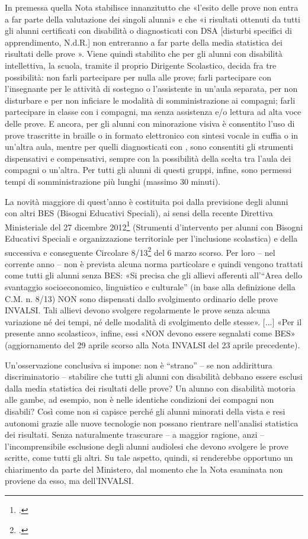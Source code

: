 In premessa quella Nota stabilisce innanzitutto che «l'esito delle prove non entra a far parte della valutazione dei singoli alunni» e che «i risultati ottenuti da tutti gli alunni certificati con disabilità o diagnosticati con DSA [disturbi specifici di apprendimento, N.d.R.] non entreranno a far parte della media statistica dei risultati delle prove ».
Viene quindi stabilito che per gli alunni con disabilità intellettiva, la scuola, tramite il proprio Dirigente Scolastico, decida fra tre possibilità: non farli partecipare per nulla alle prove; farli partecipare con l'insegnante per le attività di sostegno o l'assistente in un'aula separata, per non disturbare e per non inficiare le modalità di somministrazione ai compagni; farli partecipare in classe con i compagni, ma senza assistenza e/o lettura ad alta voce delle prove.
E ancora, per gli alunni con minorazione visiva è consentito l'uso di prove trascritte in braille o in formato elettronico con sintesi vocale in cuffia o in un'altra aula, mentre per quelli diagnosticati con , sono consentiti gli strumenti dispensativi e compensativi, sempre con la possibilità della scelta tra l'aula dei compagni o un'altra.
Per tutti gli alunni di questi gruppi, infine, sono permessi tempi di somministrazione più lunghi (massimo 30 minuti).

La novità maggiore di quest'anno è costituita poi dalla previsione degli alunni con altri BES (Bisogni Educativi Speciali), ai sensi della recente Direttiva Ministeriale del 27 dicembre 2012\footcite{dir27Dic2012} (Strumenti d'intervento per alunni con Bisogni Educativi Speciali e organizzazione territoriale per l'inclusione scolastica) e della successiva e conseguente Circolare 8/13\footcite{cm8_2013} del 6 marzo scorso. Per loro – nel corrente anno – non è prevista alcuna norma particolare e quindi vengono trattati come tutti gli alunni senza BES: «Si precisa che gli allievi afferenti all'“Area dello svantaggio socioeconomico, linguistico e culturale” (in base alla definizione della C.M. n. 8/13) NON sono dispensati dallo svolgimento ordinario delle prove INVALSI. Tali allievi devono svolgere regolarmente le prove senza alcuna variazione né dei tempi, né delle modalità di svolgimento delle stesse». [...] «Per il presente anno scolastico», infine, essi «NON devono essere segnalati come BES» (aggiornamento del 29 aprile scorso alla Nota INVALSI del 23 aprile precedente).

Un'osservazione conclusiva si impone: non è “strano” – se non addirittura discriminatorio – stabilire che tutti gli alunni con disabilità debbano essere esclusi dalla media statistica dei risultati delle prove? Un alunno con disabilità motoria alle gambe, ad esempio, non è nelle identiche condizioni dei compagni non disabili? Così come non si capisce perché gli alunni minorati della vista e resi autonomi grazie alle nuove tecnologie non possano rientrare nell'analisi statistica dei risultati. Senza naturalmente trascurare – a maggior ragione, anzi – l'incomprensibile esclusione degli alunni audiolesi che devono svolgere le prove scritte, come tutti gli altri.
Su tale aspetto, quindi, si renderebbe opportuno un chiarimento da parte del Ministero, dal momento che la Nota esaminata non proviene da esso, ma dell'INVALSI.

